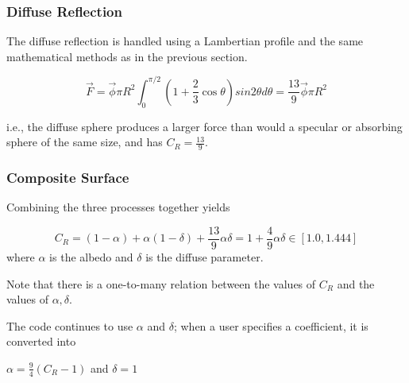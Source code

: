 \subsubsection{Diffuse Reflection}
The diffuse reflection is handled using a Lambertian profile and the
same mathematical methods as in the previous section.

\begin{equation*}
\vec F = \vec \phi \pi R^2 \int_{0}^{\pi/2} \left(1 + \frac{2}{3} \cos \theta \right) sin 2\theta d\theta = \frac{13}{9} \vec \phi \pi R^2
\end{equation*}

i.e., the diffuse sphere produces a larger force than would a specular
or absorbing sphere of the same size, and has $C_R = \frac{13}{9}$.

\subsubsection{Composite Surface}
Combining the three processes together yields

\begin{equation}
C_R = (1-\alpha) + \alpha(1-\delta) + \frac{13}{9} \alpha \delta  = 1 + \frac{4}{9} \alpha \delta \in[1.0,1.444]
\end{equation}
where $\alpha$ is the albedo and $\delta$ is the diffuse parameter.

Note that there is a one-to-many relation between the values of
$C_R$ and the values of $\alpha, \delta$.

The code continues to use $\alpha$ and $\delta$; when a user
specifies a coefficient, it is converted into

$\alpha =\frac{9}{4} (C_R - 1)$ and $\delta = 1 $
